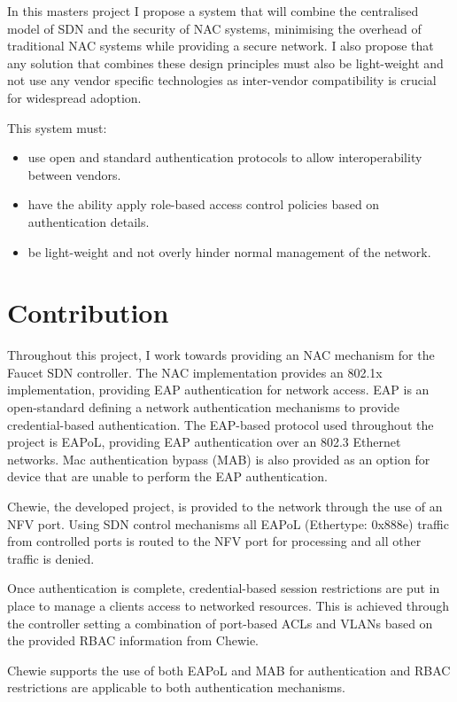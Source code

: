 In this masters project I propose a system that will combine the centralised model of SDN and the security of NAC systems, minimising the overhead of traditional NAC systems while providing a secure network. I also propose that any solution that combines these design principles must also be light-weight and not use any vendor specific technologies as inter-vendor compatibility is crucial for widespread adoption.

This system must:
\begin{itemize}
    \item use open and standard authentication protocols to allow interoperability between vendors.
    \item have the ability apply role-based access control policies based on authentication details.
    \item be light-weight and not overly hinder normal management of the network.
\end{itemize}

\section{Contribution}
Throughout this project, I work towards providing an NAC mechanism for the Faucet SDN controller.
The NAC implementation provides an 802.1x implementation, providing EAP authentication for network access. EAP is an open-standard defining a network authentication mechanisms to provide credential-based authentication. The EAP-based protocol used throughout the project is EAPoL, providing EAP authentication over an 802.3 Ethernet networks. Mac authentication bypass (MAB) is also provided as an option for device that are unable to perform the EAP authentication.

Chewie, the developed project, is provided to the network through the use of an NFV port. Using SDN control mechanisms all EAPoL (Ethertype: 0x888e\cite{iana_802_numbers}) traffic from controlled ports is routed to the NFV port for processing and all other traffic is denied.

Once authentication is complete, credential-based session restrictions are put in place to manage a clients access to networked resources. This is achieved through the controller setting a combination of port-based ACLs and VLANs based on the provided RBAC information from Chewie.

Chewie supports the use of both EAPoL and MAB for authentication and RBAC restrictions are applicable to both authentication mechanisms.

